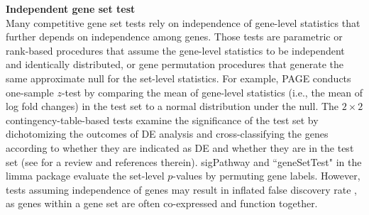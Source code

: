 \documentclass[useAMS,usenatbib, galley]{biom}
\newcommand{\gen}{geneSetTest}
\begin{document}
	
	\textbf{Independent gene set test} \\
	Many competitive gene set tests rely on independence of gene-level statistics that further depends on independence among genes. Those tests are parametric or rank-based procedures that assume the gene-level statistics to be independent and identically distributed, or gene permutation procedures that generate the same approximate null for the set-level statistics. For example, PAGE  \citep{kim2005page} conducts one-sample $z$-test by comparing the mean of gene-level statistics (i.e., the mean of log fold changes) in the test set to a normal distribution under the null. The $2\times 2$ contingency-table-based tests examine the significance of the test set by dichotomizing the outcomes of DE analysis and cross-classifying the genes according to whether they are indicated as DE and whether they are in the test set (see \cite{huang2009bioinformatics} for a review and references therein). sigPathway \citep{tian2005discovering} and ``\gen" in the limma package \citep{Smyth2004moderated} evaluate the set-level $p$-values by permuting gene labels. However, tests assuming independence of genes may result in inflated false discovery rate \citep{efron2007testing,goeman2007analyzing, gatti2010heading,wu2012camera,yaari2013quantitative}, as genes within a gene set are often co-expressed and function together.
	
\end{document}
